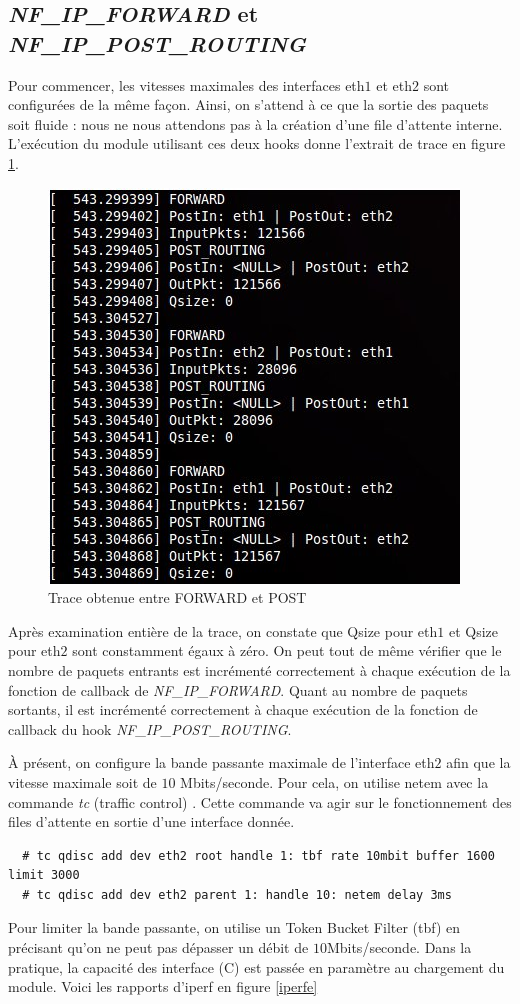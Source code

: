 \documentclass[a4paper]{article}
\begin{document}
\subsection{\textit{NF\_IP\_FORWARD} et \textit{NF\_IP\_POST\_ROUTING}}
Pour commencer, les vitesses maximales des interfaces eth$1$ et
eth$2$ sont configurées de la même façon. Ainsi, on s'attend à
ce que la sortie des paquets soit fluide : nous ne nous attendons
pas à la création d'une file d'attente interne. L'exécution du module
utilisant ces deux hooks donne l'extrait de trace en
figure \ref{forwardpost}.

\begin{figure}[!ht]
	\centering
	\includegraphics[scale=.5]{forward_post.jpg}
	\caption{\label{forwardpost} Trace obtenue entre FORWARD et POST}
\end{figure}

Après examination entière de la trace, on constate que Qsize
pour eth$1$ et Qsize pour eth$2$ sont constamment égaux à zéro.
On peut tout de même vérifier que le nombre de paquets entrants
est incrémenté correctement à chaque exécution de la fonction
de callback de \textit{NF\_IP\_FORWARD}. Quant au nombre de paquets
sortants, il est incrémenté correctement à chaque exécution de la
fonction de callback du hook \textit{NF\_IP\_POST\_ROUTING}.

À présent, on configure la bande passante maximale de l'interface
eth$2$ afin que la vitesse maximale soit de $10$ Mbits/seconde.
Pour cela, on utilise netem \cite{netem} avec la commande \textit{tc} (traffic control) \cite{tc1} \cite{tcman}.
Cette commande va agir sur le fonctionnement des files d’attente
en sortie d’une interface donnée.
\begin{verbatim}
  # tc qdisc add dev eth2 root handle 1: tbf rate 10mbit buffer 1600 limit 3000
  # tc qdisc add dev eth2 parent 1: handle 10: netem delay 3ms
\end{verbatim}
Pour limiter la bande passante, on utilise un Token Bucket Filter
(tbf) en précisant qu’on ne peut pas dépasser un débit de
$10$Mbits/seconde. Dans la pratique, la capacité des interface (C) est passée
en paramètre au chargement du module. Voici les rapports d'iperf en figure \ref{iperfe}
\end{document}
